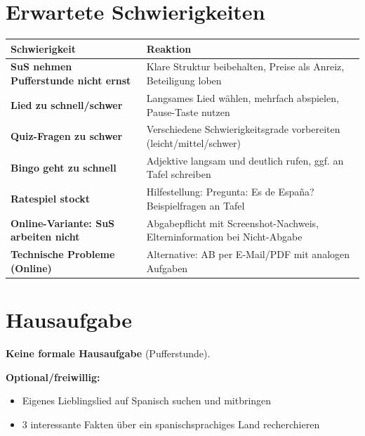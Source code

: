 \documentclass[11pt,a4paper]{article}
\begin{document}
\section{Erwartete Schwierigkeiten}

\begin{tabular}{|p{4.5cm}|p{8.5cm}|}
\hline
\textbf{Schwierigkeit} & \textbf{Reaktion} \\
\hline
\textbf{SuS nehmen Pufferstunde nicht ernst} & Klare Struktur beibehalten, Preise als Anreiz, Beteiligung loben \\
\hline
\textbf{Lied zu schnell/schwer} & Langsames Lied wählen, mehrfach abspielen, Pause-Taste nutzen \\
\hline
\textbf{Quiz-Fragen zu schwer} & Verschiedene Schwierigkeitsgrade vorbereiten (leicht/mittel/schwer) \\
\hline
\textbf{Bingo geht zu schnell} & Adjektive langsam und deutlich rufen, ggf. an Tafel schreiben \\
\hline
\textbf{Ratespiel stockt} & Hilfestellung: \glqq{}Pregunta: \textquestiondown{}Es de España?\grqq{} Beispielfragen an Tafel \\
\hline
\textbf{Online-Variante: SuS arbeiten nicht} & Abgabepflicht mit Screenshot-Nachweis, Elterninformation bei Nicht-Abgabe \\
\hline
\textbf{Technische Probleme (Online)} & Alternative: AB per E-Mail/PDF mit analogen Aufgaben \\
\hline
\end{tabular}

\section{Hausaufgabe}

\textbf{Keine formale Hausaufgabe} (Pufferstunde).

\vspace{0.5em}
\textbf{Optional/freiwillig:}
\begin{itemize}
    \item Eigenes Lieblingslied auf Spanisch suchen und mitbringen
    \item 3 interessante Fakten über ein spanischsprachiges Land recherchieren
\end{itemize}
\end{document}
